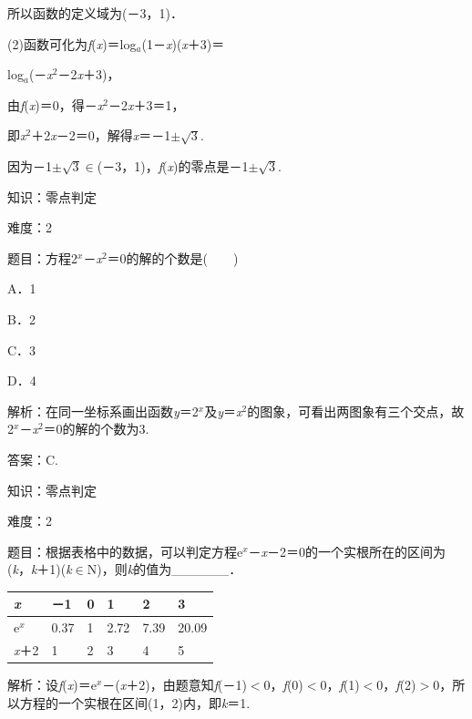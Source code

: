 \documentclass{article} %
\begin{document}
所以函数的定义域为(－3，1)．

(2)函数可化为\textit{f}(\textit{x})＝log\textit{${}_{a}$}(1－\textit{x})(\textit{x}＋3)＝

log\textit{${}_{a}$}(－\textit{x}${}^{2}$－2\textit{x}＋3)，

由\textit{f}(\textit{x})＝0，得－\textit{x}${}^{2}$－2\textit{x}＋3＝1，

即\textit{x}${}^{2}$＋2\textit{x}－2＝0，解得\textit{x}＝－1$\mathrm{\pm}$$\sqrt{3}$.

因为－1$\mathrm{\pm}$$\sqrt{3}$$\mathrm{\in}$(－3，1)，\textit{f}(\textit{x})的零点是－1$\mathrm{\pm}$$\sqrt{3}$.

知识：零点判定

难度：2

题目：方程2\textit{${}^{x}$}－\textit{x}${}^{2}$＝0的解的个数是(　　)

A．1  

B．2  

C．3  

D．4

解析：在同一坐标系画出函数\textit{y}＝2\textit{${}^{x}$}及\textit{y}＝\textit{x}${}^{2}$的图象，可看出两图象有三个交点，故2\textit{${}^{x}$}－\textit{x}${}^{2}$＝0的解的个数为3.

答案：C.

知识：零点判定

难度：2

题目：根据表格中的数据，可以判定方程e\textit{${}^{x}$}－\textit{x}－2＝0的一个实根所在的区间为(\textit{k}，\textit{k}＋1)(\textit{k}$\mathrm{\in}$N)，则\textit{k}的值为\_\_\_\_\_\_．

\textit{}

\begin{tabular}{|p{0.5in}|p{0.4in}|p{0.2in}|p{0.4in}|p{0.4in}|p{0.4in}|} \hline
	\textit{x} & －1\textit{} & 0\textit{} & 1\textit{} & 2\textit{} & 3 \\ \hline
	e\textit{${}^{x}$} & 0.37\textit{} & 1\textit{} & 2.72\textit{} & 7.39\textit{} & 20.09 \\ \hline
	\textit{x}＋2\textit{} & 1\textit{} & 2\textit{} & 3\textit{} & 4\textit{} & 5 \\ \hline
\end{tabular}

解析：设\textit{f}(\textit{x})＝e\textit{${}^{x}$}－(\textit{x}＋2)，由题意知\textit{f}(－1)$\mathrm{<}$0，\textit{f}(0)$\mathrm{<}$0，\textit{f}(1)$\mathrm{<}$0，\textit{f}(2)$\mathrm{>}$0，所以方程的一个实根在区间(1，2)内，即\textit{k}＝1.
\end{document}
